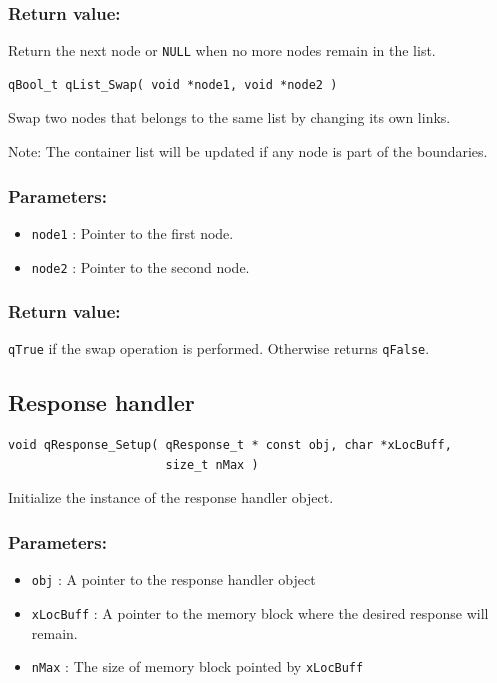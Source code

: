 \documentclass{article}
\begin{document}
\subsubsection*{Return value:}
Return the next node or \lstinline{NULL} when no more nodes remain in the list. 

\noindent\hrulefill

\begin{lstlisting}[style=CStyle]
qBool_t qList_Swap( void *node1, void *node2 )
\end{lstlisting} 

Swap two nodes that belongs to the same list by changing its own links.

Note: The container list will be updated if any node is part of the boundaries.

\subsubsection*{Parameters:}
\begin{itemize}
    \item \lstinline{node1} : Pointer to the first node.
    \item \lstinline{node2} : Pointer to the second node.
\end{itemize}

\subsubsection*{Return value:}
\lstinline{qTrue} if the swap operation is performed. Otherwise returns \lstinline{qFalse}.


\subsection{Response handler}

\begin{lstlisting}[style=CStyle]
void qResponse_Setup( qResponse_t * const obj, char *xLocBuff, 
                      size_t nMax )
\end{lstlisting}

Initialize the instance of the response handler object. 

\subsubsection*{Parameters:}
\begin{itemize}
    \item \lstinline{obj} : A pointer to the response handler object
    \item \lstinline{xLocBuff} : A pointer to the memory block where the desired response will remain.
    \item \lstinline{nMax} : The size of memory block pointed by \lstinline{xLocBuff}
\end{itemize}
\end{document}
